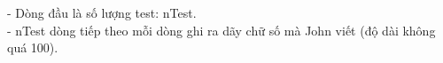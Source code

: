 - Dòng đầu là số lượng test: nTest.
\\- nTest dòng tiếp theo mỗi dòng ghi ra dãy chữ số mà John viết (độ dài không quá 100).